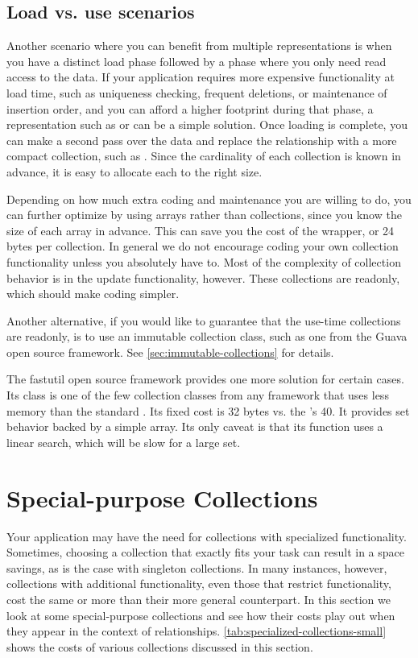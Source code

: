 \subsection{Load vs. use scenarios}

Another scenario where you can benefit from multiple representations is when you
have a distinct load phase followed by a phase where you only need read access
to the data. If your application requires more expensive functionality at load
time, such as uniqueness checking, frequent deletions, or maintenance of
insertion order, and you can afford a higher footprint during that phase, a
representation such as  or  can be a simple
solution. Once loading is complete, you can make a second pass over
the data and replace the relationship with a more compact collection, such
as . Since the cardinality of each collection is known in
advance, it is easy to allocate each  to the right size.

Depending on how much extra coding and maintenance you are willing to do, you
can further optimize by using arrays rather than collections, since you know the
size of each array in advance. This can save you
the cost of the  wrapper, or 24 bytes per collection. In
general we do not encourage coding your own collection functionality unless
you absolutely have to.  Most of the complexity of collection
behavior is in the update functionality, however. These collections are
readonly, which should make coding simpler.

Another alternative, if you would like to guarantee that the use-time
collections are readonly, is to use an immutable collection class, such as
one from the Guava open source framework. See
\autoref{sec:immutable-collections} for details.

The fastutil open source framework provides one more
solution for certain cases. Its  class is one of the few
collection classes from any framework that uses less memory than the standard .  Its
fixed cost is 32 bytes vs. the 's 40.  It provides set behavior
backed by a simple array. Its only caveat is that its  function
uses a linear search, which will be slow for a large set. 

\section{Special-purpose Collections}
Your application may have the need for collections with specialized
functionality.  Sometimes, choosing a collection
that exactly fits your task can result in a space savings, as is the case with
singleton collections. In many instances, however, collections with additional
functionality, even those that restrict functionality, cost
the same or more than their more general counterpart. 
In this section we look at some special-purpose collections and see how
their costs play out when they appear in the context of relationships. 
\autoref{tab:specialized-collections-small} shows
the costs of various collections discussed in this section.

